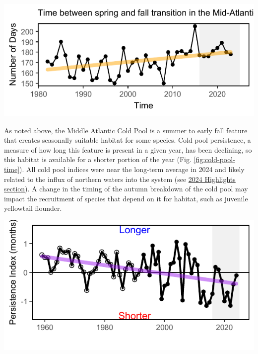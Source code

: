 \documentclass[
  10pt,
]{article}
\let\origfigure\figure
\let\endorigfigure\endfigure
\renewenvironment{figure}[1][2] {
    \expandafter\origfigure\expandafter[H]
} {
    \endorigfigure
}
\begin{document}
\begin{figure}

{\centering \includegraphics{midatlantic_files/figure-latex/transition-1} 

}

\caption{Ocean summer length in the MAB: the annual total number of days between the spring thermal transition date and the fall thermal transition date (black), with an increasing trend (orange).}\label{fig:transition}
\end{figure}

As noted above, the Middle Atlantic \href{https://noaa-edab.github.io/catalog/cold_pool.html}{Cold Pool} is a summer to early fall feature that creates seasonally suitable habitat for some species. Cold pool persistence, a measure of how long this feature is present in a given year, has been declining, so this habitat is available for a shorter portion of the year (Fig. \ref{fig:cold-pool-time}). All cold pool indices were near the long-term average in 2024 and likely related to the influx of northern waters into the system (see \hyperref[highlights]{2024 Highlights section}). A change in the timing of the autumn breakdown of the cold pool may impact the recruitment of species that depend on it for habitat, such as juvenile yellowtail flounder.

\begin{figure}

{\centering \includegraphics{midatlantic_files/figure-latex/cold-pool-time-1} 

}

\caption{Cold pool persistence index based on bias-corrected ROMS-NWA (open circles) and GLORYS (closed circles).}\label{fig:cold-pool-time}
\end{figure}
\end{document}
